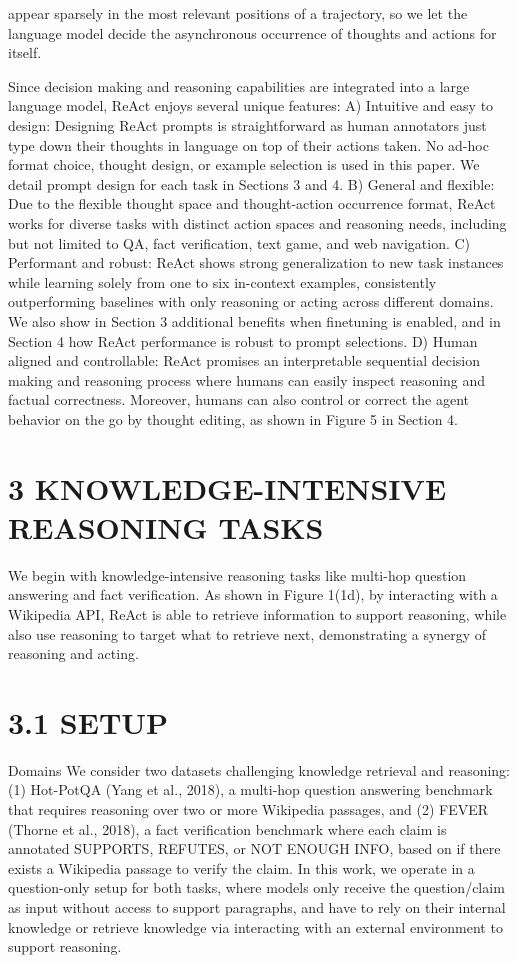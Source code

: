 \documentclass[
]{article}
\begin{document}
appear sparsely in the most relevant positions of a trajectory, so we
let the language model decide the asynchronous occurrence of thoughts
and actions for itself.

Since decision making and reasoning capabilities are integrated into a
large language model, ReAct enjoys several unique features: A) Intuitive
and easy to design: Designing ReAct prompts is straightforward as human
annotators just type down their thoughts in language on top of their
actions taken. No ad-hoc format choice, thought design, or example
selection is used in this paper. We detail prompt design for each task
in Sections 3 and 4. B) General and flexible: Due to the flexible
thought space and thought-action occurrence format, ReAct works for
diverse tasks with distinct action spaces and reasoning needs, including
but not limited to QA, fact verification, text game, and web navigation.
C) Performant and robust: ReAct shows strong generalization to new task
instances while learning solely from one to six in-context examples,
consistently outperforming baselines with only reasoning or acting
across different domains. We also show in Section 3 additional benefits
when finetuning is enabled, and in Section 4 how ReAct performance is
robust to prompt selections. D) Human aligned and controllable: ReAct
promises an interpretable sequential decision making and reasoning
process where humans can easily inspect reasoning and factual
correctness. Moreover, humans can also control or correct the agent
behavior on the go by thought editing, as shown in Figure 5 in Section
4.

\section{3 KNOWLEDGE-INTENSIVE REASONING
TASKS}\label{knowledge-intensive-reasoning-tasks}

We begin with knowledge-intensive reasoning tasks like multi-hop
question answering and fact verification. As shown in Figure 1(1d), by
interacting with a Wikipedia API, ReAct is able to retrieve information
to support reasoning, while also use reasoning to target what to
retrieve next, demonstrating a synergy of reasoning and acting.

\section{3.1 SETUP}\label{setup}

Domains We consider two datasets challenging knowledge retrieval and
reasoning: (1) Hot-PotQA (Yang et al., 2018), a multi-hop question
answering benchmark that requires reasoning over two or more Wikipedia
passages, and (2) FEVER (Thorne et al., 2018), a fact verification
benchmark where each claim is annotated SUPPORTS, REFUTES, or NOT ENOUGH
INFO, based on if there exists a Wikipedia passage to verify the claim.
In this work, we operate in a question-only setup for both tasks, where
models only receive the question/claim as input without access to
support paragraphs, and have to rely on their internal knowledge or
retrieve knowledge via interacting with an external environment to
support reasoning.
\end{document}
